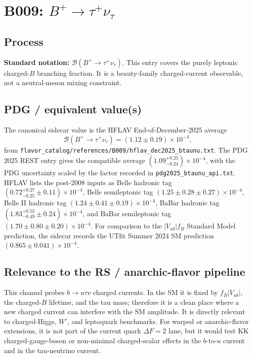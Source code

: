 
\section{B009: \(B^+\to\tau^+\nu_\tau\)}

\subsection*{Process}
\textbf{Standard notation:} \(\mathcal{B}(B^+\to\tau^+\nu_\tau)\).
This entry covers the purely leptonic charged-\(B\) branching fraction.  It is
a beauty-family charged-current observable, not a neutral-meson mixing
constraint.

\subsection*{PDG / equivalent value(s)}
The canonical sidecar value is the HFLAV End-of-December-2025 average
\[
  \mathcal{B}(B^+\to\tau^+\nu_\tau) = (1.12 \pm 0.19)\times 10^{-4},
\]
from \texttt{flavor\_catalog/references/B009/hflav\_dec2025\_btaunu.txt}.
The PDG 2025 REST entry gives the compatible average
\((1.09^{+0.25}_{-0.24})\times 10^{-4}\), with the PDG uncertainty scaled by
the factor recorded in \texttt{pdg2025\_btaunu\_api.txt}.  HFLAV lists the
post-2008 inputs as Belle hadronic tag \((0.72^{+0.27}_{-0.25}\pm0.11)\times
10^{-4}\), Belle semileptonic tag \((1.25\pm0.28\pm0.27)\times10^{-4}\),
Belle II hadronic tag \((1.24\pm0.41\pm0.19)\times10^{-4}\), BaBar hadronic
tag \((1.83^{+0.53}_{-0.49}\pm0.24)\times10^{-4}\), and BaBar semileptonic
tag \((1.70\pm0.80\pm0.20)\times10^{-4}\).  For comparison to the
\(|V_{ub}| f_B\) Standard Model prediction, the sidecar records the UTfit
Summer 2024 SM prediction \((0.865\pm0.041)\times10^{-4}\).

\subsection*{Relevance to the RS / anarchic-flavor pipeline}
This channel probes \(b\to u\tau\nu\) charged currents.  In the SM it is fixed
by \(f_B |V_{ub}|\), the charged-\(B\) lifetime, and the tau mass; therefore it
is a clean place where a new charged current can interfere with the SM
amplitude.  It is directly relevant to charged-Higgs, \(W'\), and leptoquark
benchmarks.  For warped or anarchic-flavor extensions, it is not part of the
current quark \(\Delta F=2\) lane, but it would test KK charged-gauge-boson or
non-minimal charged-scalar effects in the \(b\)-to-\(u\) current and in the
tau-neutrino current.

